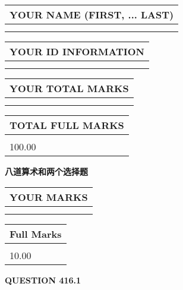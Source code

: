 \documentclass{ctexart}
\begin{document}
 
 
 
 
   
   
\newpage 
\setcounter{page}{ 
   416001 } 
   
   
   
   
\noindent\begin{tabular}{|l|}
\hline
YOUR NAME (FIRST, ... LAST)  \\
\hline
 \\ 
 \\ 
\hline
\end{tabular}
\hspace{0.05in} \begin{tabular}{|l|}
\hline
 YOUR   ID   INFORMATION  \\
\hline
 \\ 
 \\ 
\hline
\end{tabular}
   
   
\vspace{0.2in}\noindent\begin{tabular}{|l|}
\hline
YOUR TOTAL MARKS  \\
\hline
 \\ 
 \\ 
\hline
\end{tabular}
\hspace{0.05in} \begin{tabular}{|l|}
\hline
TOTAL FULL MARKS  \\
\hline
 \\ 
100.00 \\
\hline
\end{tabular}
   
   
 \vspace{0.2in}
{\LARGE {\textbf{ 八道算术和两个选择题}}}
   
   
  
\vspace{0.2in}
  
\noindent\begin{tabular}{|l|}
\hline
 YOUR MARKS  \\
\hline
 \\ 
 \\ 
\hline
\end{tabular}
\hspace{0.05in} \begin{tabular}{|l|}
\hline
 Full Marks  \\
\hline
 \\ 
10.00 \\
\hline
\end{tabular}
{\textbf{\Large{QUESTION
416.1 
}}}
  
\end{document}
